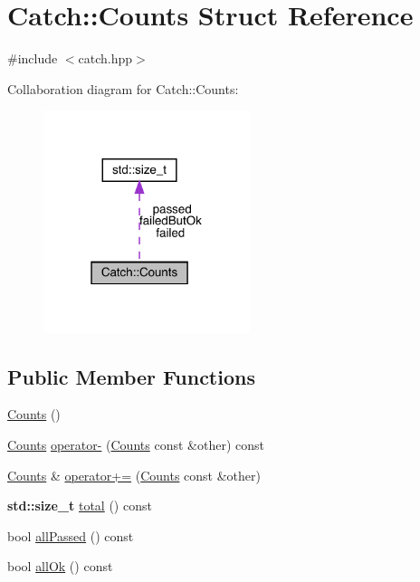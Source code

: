 \hypertarget{struct_catch_1_1_counts}{}\section{Catch\+:\+:Counts Struct Reference}
\label{struct_catch_1_1_counts}


{\ttfamily \#include $<$catch.\+hpp$>$}



Collaboration diagram for Catch\+:\+:Counts\+:
\nopagebreak
\begin{figure}[H]
\begin{center}
\leavevmode
\includegraphics[width=171pt]{struct_catch_1_1_counts__coll__graph}
\end{center}
\end{figure}
\subsection*{Public Member Functions}
\begin{DoxyCompactItemize}
\item 
\hyperlink{struct_catch_1_1_counts_aab9092ce70d4b0179cc743555d2fc39b}{Counts} ()
\item 
\hyperlink{struct_catch_1_1_counts}{Counts} \hyperlink{struct_catch_1_1_counts_aaa10666f559057e3e860d2a5a6fae4c4}{operator-\/} (\hyperlink{struct_catch_1_1_counts}{Counts} const \&other) const
\item 
\hyperlink{struct_catch_1_1_counts}{Counts} \& \hyperlink{struct_catch_1_1_counts_a322a89475cd2cc039140ef371e973677}{operator+=} (\hyperlink{struct_catch_1_1_counts}{Counts} const \&other)
\item 
\textbf{ std\+::size\+\_\+t} \hyperlink{struct_catch_1_1_counts_a94f969c09cf52d1339c085c9603cd1d3}{total} () const
\item 
bool \hyperlink{struct_catch_1_1_counts_a84999490e0ecaa3de5e121bf48eda1b3}{all\+Passed} () const
\item 
bool \hyperlink{struct_catch_1_1_counts_a33bd996e016030155b99fe1c51c08991}{all\+Ok} () const
\end{DoxyCompactItemize}
